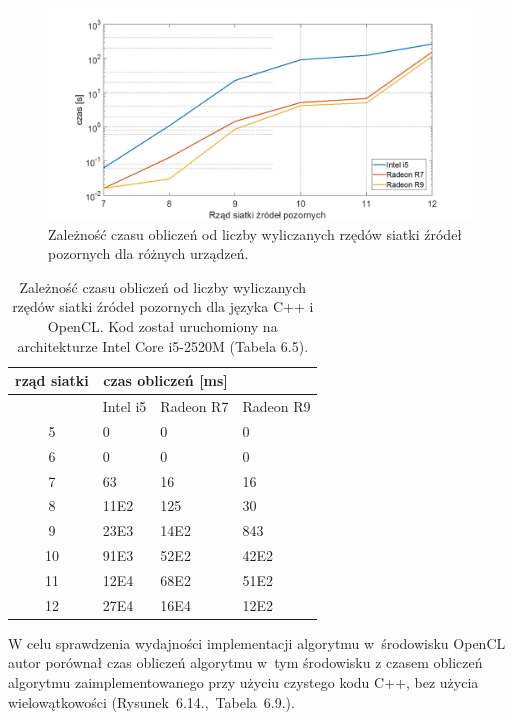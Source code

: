 \begin{figure}[H]
        \centering
                \centering
                \includegraphics[width=16cm]{wykres}
	\caption{Zależność czasu obliczeń od liczby wyliczanych rzędów siatki źródeł pozornych dla różnych urządzeń.}
\end{figure}

\begin{table}[H]
        \centering
        \begin{threeparttable}
                \caption{Zależność czasu obliczeń od liczby wyliczanych rzędów siatki źródeł pozornych dla języka C++ i OpenCL. Kod został uruchomiony na architekturze Intel Core i5-2520M (Tabela 6.5).}\label{tab:table_exa2mple}
                \begin{tabularx}{0.6\textwidth}{| c | X | X | X |}
                        \midrule
                        	rząd siatki &	\multicolumn{2}{c}{czas obliczeń [ms]} & \\
                 \midrule
		                         & Intel i5 & Radeon R7 & Radeon R9 \\
                 \midrule
 5 & 0 & 0  & 0 \\
6 & 0 & 0 & 0 \\
7 & 63 & 16 & 16 \\
8 & 11E2 & 125 & 30 \\
9 & 23E3 & 14E2 & 843 \\
10 & 91E3 & 52E2 & 42E2 \\
11 & 12E4 & 68E2 & 51E2 \\
12 & 27E4 & 16E4 & 12E2 \\
                        \bottomrule
                \end{tabularx}
        \end{threeparttable}
\end{table}

W celu sprawdzenia wydajności implementacji algorytmu w~środowisku OpenCL autor porównał czas obliczeń algorytmu w~tym środowisku z czasem obliczeń algorytmu zaimplementowanego przy użyciu czystego kodu C++, bez użycia wielowątkowości (Rysunek~6.14.,~Tabela~6.9.).


